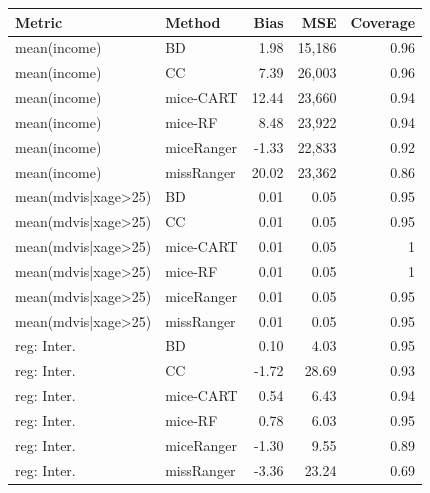 \documentclass[20pt,margin=1in,innermargin=-4.5in,blockverticalspace=-0.25in]{tikzposter}
\begin{document}
\begin{columns}
{        \begin{center}
            \vspace{-0.5em}
            \begin{tabular}{|l|l|rrr|}
             \hline   
             Metric &  Method & Bias \hspace{10mm} & MSE \hspace{5mm} & Coverage\\
             \hline
             mean(income) & BD & 1.98  & 15,186 & 0.96\\
             mean(income) & CC & 7.39  & 26,003 & 0.96\\
             mean(income) & mice-CART & 12.44 & 23,660 & 0.94\\
             mean(income) & mice-RF & 8.48 & 23,922 & 0.94\\
             mean(income) & miceRanger & -1.33 & 22,833 & 0.92\\
             mean(income) & missRanger  & 20.02 & 23,362 & 0.86 \\
             \hline
             mean(mdvis|xage>25) & BD & 0.01 & 0.05 & 0.95\\
             mean(mdvis|xage>25) & CC & 0.01 & 0.05 & 0.95\\
             mean(mdvis|xage>25) & mice-CART & 0.01 & 0.05 & 1\\
             mean(mdvis|xage>25) & mice-RF & 0.01 & 0.05 & 1\\
             mean(mdvis|xage>25) & miceRanger & 0.01 & 0.05 & 0.95\\
             mean(mdvis|xage>25) & missRanger  & 0.01 & 0.05 & 0.95\\
             \hline
             reg: Inter. & BD & 0.10 & 4.03 & 0.95\\
             reg: Inter. & CC & -1.72 & 28.69 & 0.93\\
             reg: Inter. & mice-CART & 0.54 & 6.43 & 0.94\\
             reg: Inter. & mice-RF & 0.78 & 6.03 & 0.95\\
             reg: Inter. & miceRanger & -1.30 & 9.55 & 0.89\\
             reg: Inter. & missRanger  & -3.36 & 23.24 & 0.69\\
             \hline
        \end{tabular}
        \end{center}


    }
  

\end{columns}
\end{document}
